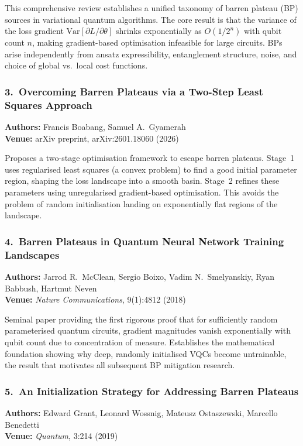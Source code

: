\documentclass[10pt,twocolumn]{article}
\begin{document}
This comprehensive review establishes a unified taxonomy of barren plateau (BP) sources in variational quantum algorithms. The core result is that the variance of the loss gradient $\text{Var}[\partial L/\partial\theta]$ shrinks exponentially as $O(1/2^n)$ with qubit count $n$, making gradient-based optimisation infeasible for large circuits. BPs arise independently from ansatz expressibility, entanglement structure, noise, and choice of global vs.\ local cost functions.

\subsubsection*{3.\ Overcoming Barren Plateaus via a Two-Step Least Squares Approach}
\textbf{Authors:} Francis Boabang, Samuel A.\ Gyamerah\\
\textbf{Venue:} arXiv preprint, arXiv:2601.18060 (2026)

Proposes a two-stage optimisation framework to escape barren plateaus. Stage~1 uses regularised least squares (a convex problem) to find a good initial parameter region, shaping the loss landscape into a smooth basin. Stage~2 refines these parameters using unregularised gradient-based optimisation. This avoids the problem of random initialisation landing on exponentially flat regions of the landscape.

\subsubsection*{4.\ Barren Plateaus in Quantum Neural Network Training Landscapes}
\textbf{Authors:} Jarrod R.\ McClean, Sergio Boixo, Vadim N.\ Smelyanskiy, Ryan Babbush, Hartmut Neven\\
\textbf{Venue:} \emph{Nature Communications}, 9(1):4812 (2018)

Seminal paper providing the first rigorous proof that for sufficiently random parameterised quantum circuits, gradient magnitudes vanish exponentially with qubit count due to concentration of measure. Establishes the mathematical foundation showing why deep, randomly initialised VQCs become untrainable, the result that motivates all subsequent BP mitigation research.

\subsubsection*{5.\ An Initialization Strategy for Addressing Barren Plateaus}
\textbf{Authors:} Edward Grant, Leonard Wossnig, Mateusz Ostaszewski, Marcello Benedetti\\
\textbf{Venue:} \emph{Quantum}, 3:214 (2019)
\end{document}
